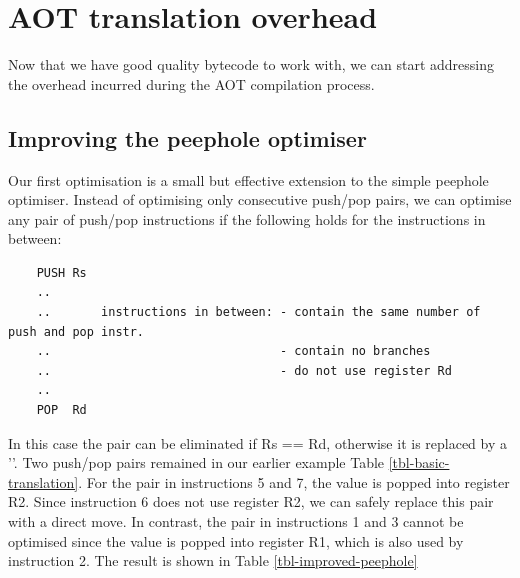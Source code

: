 \section{AOT translation overhead}
\label{sec-optimisations-aot-translation-overhead}
Now that we have good quality bytecode to work with, we can start addressing the overhead incurred during the AOT compilation process.

\subsection{Improving the peephole optimiser}
\label{sec-improved-peephole}


Our first optimisation is a small but effective extension to the simple peephole optimiser. Instead of optimising only consecutive push/pop pairs, we can optimise any pair of push/pop instructions if the following holds for the instructions in between:

\begin{listing}
    \begin{verbatim}
    PUSH Rs
    ..
    ..       instructions in between: - contain the same number of push and pop instr.
    ..                                - contain no branches
    ..                                - do not use register Rd
    ..
    POP  Rd
     \end{verbatim}
\end{listing}

In this case the pair can be eliminated if Rs == Rd, otherwise it is replaced by a ''. Two push/pop pairs remained in our earlier example Table \ref{tbl-basic-translation}. For the pair in instructions 5 and 7, the value is popped into register R2. Since instruction 6 does not use register R2, we can safely replace this pair with a direct move. In contrast, the pair in instructions 1 and 3 cannot be optimised since the value is popped into register R1, which is also used by instruction 2. The result is shown in Table \ref{tbl-improved-peephole}

